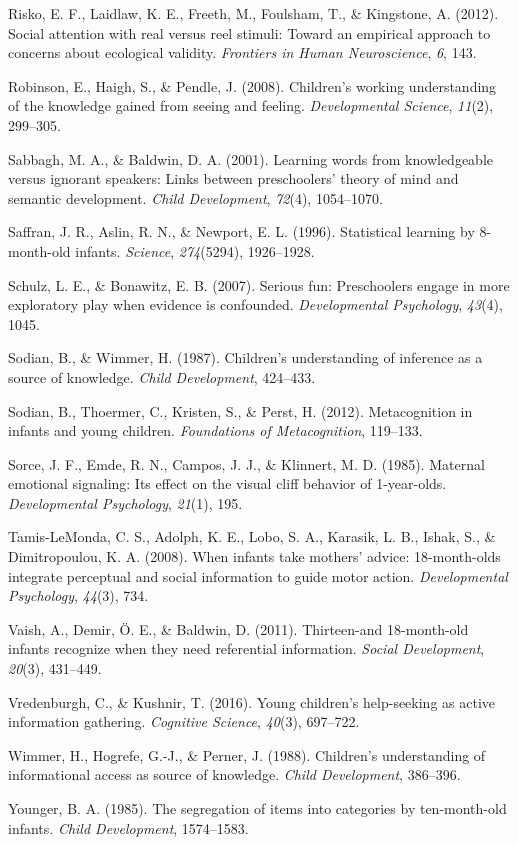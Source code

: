\documentclass[man]{apa6}
\theoremstyle{definition}
\theoremstyle{definition}
\theoremstyle{definition}
\theoremstyle{remark}
\begin{document}
\hypertarget{ref-risko2012social}{}
Risko, E. F., Laidlaw, K. E., Freeth, M., Foulsham, T., \& Kingstone, A.
(2012). Social attention with real versus reel stimuli: Toward an
empirical approach to concerns about ecological validity.
\emph{Frontiers in Human Neuroscience}, \emph{6}, 143.

\hypertarget{ref-robinson2008children}{}
Robinson, E., Haigh, S., \& Pendle, J. (2008). Children's working
understanding of the knowledge gained from seeing and feeling.
\emph{Developmental Science}, \emph{11}(2), 299--305.

\hypertarget{ref-sabbagh2001learning}{}
Sabbagh, M. A., \& Baldwin, D. A. (2001). Learning words from
knowledgeable versus ignorant speakers: Links between preschoolers'
theory of mind and semantic development. \emph{Child Development},
\emph{72}(4), 1054--1070.

\hypertarget{ref-saffran1996statistical}{}
Saffran, J. R., Aslin, R. N., \& Newport, E. L. (1996). Statistical
learning by 8-month-old infants. \emph{Science}, \emph{274}(5294),
1926--1928.

\hypertarget{ref-schulz2007serious}{}
Schulz, L. E., \& Bonawitz, E. B. (2007). Serious fun: Preschoolers
engage in more exploratory play when evidence is confounded.
\emph{Developmental Psychology}, \emph{43}(4), 1045.

\hypertarget{ref-sodian1987children}{}
Sodian, B., \& Wimmer, H. (1987). Children's understanding of inference
as a source of knowledge. \emph{Child Development}, 424--433.

\hypertarget{ref-sodian2012metacognition}{}
Sodian, B., Thoermer, C., Kristen, S., \& Perst, H. (2012).
Metacognition in infants and young children. \emph{Foundations of
Metacognition}, 119--133.

\hypertarget{ref-sorce1985maternal}{}
Sorce, J. F., Emde, R. N., Campos, J. J., \& Klinnert, M. D. (1985).
Maternal emotional signaling: Its effect on the visual cliff behavior of
1-year-olds. \emph{Developmental Psychology}, \emph{21}(1), 195.

\hypertarget{ref-tamis2008infants}{}
Tamis-LeMonda, C. S., Adolph, K. E., Lobo, S. A., Karasik, L. B., Ishak,
S., \& Dimitropoulou, K. A. (2008). When infants take mothers' advice:
18-month-olds integrate perceptual and social information to guide motor
action. \emph{Developmental Psychology}, \emph{44}(3), 734.

\hypertarget{ref-vaish2011thirteen}{}
Vaish, A., Demir, Ö. E., \& Baldwin, D. (2011). Thirteen-and
18-month-old infants recognize when they need referential information.
\emph{Social Development}, \emph{20}(3), 431--449.

\hypertarget{ref-vredenburgh2016young}{}
Vredenburgh, C., \& Kushnir, T. (2016). Young children's help-seeking as
active information gathering. \emph{Cognitive Science}, \emph{40}(3),
697--722.

\hypertarget{ref-wimmer1988children}{}
Wimmer, H., Hogrefe, G.-J., \& Perner, J. (1988). Children's
understanding of informational access as source of knowledge.
\emph{Child Development}, 386--396.

\hypertarget{ref-younger1985segregation}{}
Younger, B. A. (1985). The segregation of items into categories by
ten-month-old infants. \emph{Child Development}, 1574--1583.
\end{document}
